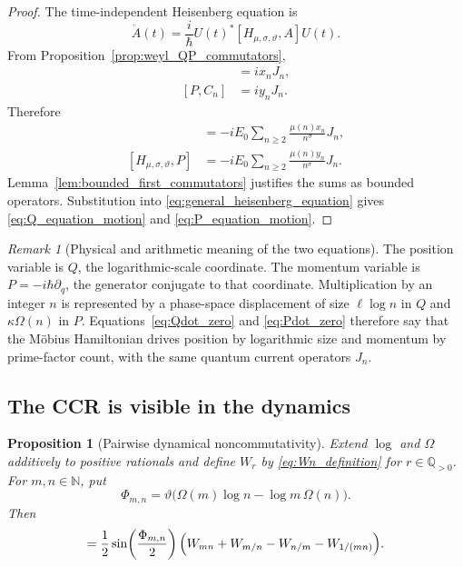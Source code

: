 \documentclass[11pt]{amsart}
\numberwithin{equation}{section}
\theoremstyle{plain}
\newtheorem{proposition}[theorem]{Proposition}
\theoremstyle{definition}
\theoremstyle{remark}
\newtheorem{remark}[theorem]{Remark}
\newcommand{\N}{\mathbb{N}}
\newcommand{\Qp}{\mathbb{Q}_{>0}}
\newcommand{\Om}{\Omega}
\begin{document}
\begin{proof}
The time-independent Heisenberg equation is
\begin{equation}
\dot A(t)
=
\frac{i}{\hbar}U(t)^*[H_{\mu,\sigma,\vartheta},A]U(t).
\label{eq:general_heisenberg_equation}
\end{equation}
From Proposition~\ref{prop:weyl_QP_commutators},
\begin{align}
[Q,C_n]
&=ix_nJ_n,
\label{eq:Q_Cn_commutator}\\
[P,C_n]
&=iy_nJ_n.
\label{eq:P_Cn_commutator}
\end{align}
Therefore
\begin{align}
[H_{\mu,\sigma,\vartheta},Q]
&=
-iE_0\sum_{n\ge2}
\frac{\mu(n)x_n}{n^{\sigma}}J_n,
\label{eq:H_Q_commutator}\\
[H_{\mu,\sigma,\vartheta},P]
&=
-iE_0\sum_{n\ge2}
\frac{\mu(n)y_n}{n^{\sigma}}J_n.
\label{eq:H_P_commutator}
\end{align}
Lemma~\ref{lem:bounded_first_commutators} justifies the sums as bounded
operators.  Substitution into \eqref{eq:general_heisenberg_equation} gives
\eqref{eq:Q_equation_motion} and \eqref{eq:P_equation_motion}.
\end{proof}

\begin{remark}[Physical and arithmetic meaning of the two equations]
\label{rem:meaning_equations_motion}
The position variable is $Q$, the logarithmic-scale coordinate.  The
momentum variable is $P=-i\hbar\partial_q$, the generator conjugate to that
coordinate.  Multiplication by an integer $n$ is represented by a phase-space
displacement of size $\ell\log n$ in $Q$ and $\kappa\Om(n)$ in $P$.
Equations~\eqref{eq:Qdot_zero} and \eqref{eq:Pdot_zero} therefore say that
the M\"obius Hamiltonian drives position by logarithmic size and momentum by
prime-factor count, with the same quantum current operators $J_n$.
\end{remark}

\subsection{The CCR is visible in the dynamics}
\label{subsec:CCR_in_dynamics}

\begin{proposition}[Pairwise dynamical noncommutativity]
\label{prop:CJ_commutator}
Extend $\log$ and $\Om$ additively to positive rationals and define $W_r$ by
\eqref{eq:Wn_definition} for $r\in\Qp$.  For $m,n\in\N$, put
\begin{equation}
\Phi_{m,n}
=
\vartheta\bigl(\Om(m)\log n-\log m\,\Om(n)\bigr).
\label{eq:Phi_mn}
\end{equation}
Then
\begin{align}
[C_m,J_n]
=
\frac12\sin\!\left(\frac{\Phi_{m,n}}{2}\right)
\Bigl(
W_{mn}+W_{m/n}-W_{n/m}-W_{1/(mn)}
\Bigr).
\label{eq:Cm_Jn_commutator}
\end{align}
\end{proposition}
\end{document}
